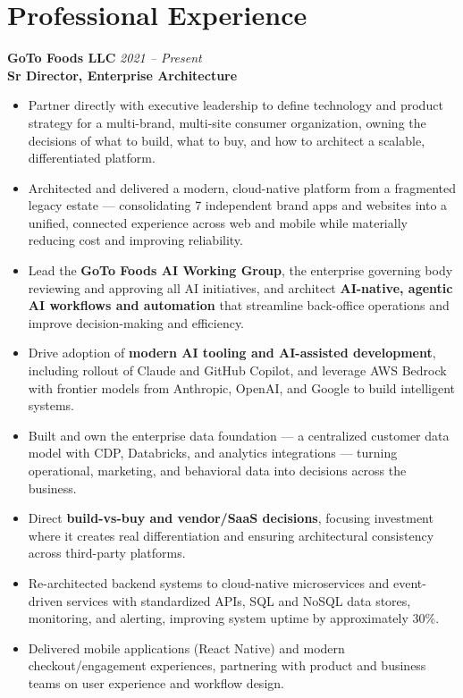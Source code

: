 \documentclass[11pt]{article}
\begin{document}
\section*{Professional Experience}

\textbf{GoTo Foods LLC} \hfill \textit{2021 -- Present} \\
\textbf{Sr Director, Enterprise Architecture}

\begin{itemize}
  \item Partner directly with executive leadership to define technology and product strategy for a multi-brand, multi-site consumer organization, owning the decisions of what to build, what to buy, and how to architect a scalable, differentiated platform.
  \item Architected and delivered a modern, cloud-native platform from a fragmented legacy estate --- consolidating 7 independent brand apps and websites into a unified, connected experience across web and mobile while materially reducing cost and improving reliability.
  \item Lead the \textbf{GoTo Foods AI Working Group}, the enterprise governing body reviewing and approving all AI initiatives, and architect \textbf{AI-native, agentic AI workflows and automation} that streamline back-office operations and improve decision-making and efficiency.
  \item Drive adoption of \textbf{modern AI tooling and AI-assisted development}, including rollout of Claude and GitHub Copilot, and leverage AWS Bedrock with frontier models from Anthropic, OpenAI, and Google to build intelligent systems.
  \item Built and own the enterprise data foundation --- a centralized customer data model with CDP, Databricks, and analytics integrations --- turning operational, marketing, and behavioral data into decisions across the business.
  \item Direct \textbf{build-vs-buy and vendor/SaaS decisions}, focusing investment where it creates real differentiation and ensuring architectural consistency across third-party platforms.
  \item Re-architected backend systems to cloud-native microservices and event-driven services with standardized APIs, SQL and NoSQL data stores, monitoring, and alerting, improving system uptime by approximately 30\%.
  \item Delivered mobile applications (React Native) and modern checkout/engagement experiences, partnering with product and business teams on user experience and workflow design.

\end{itemize}
\end{document}
